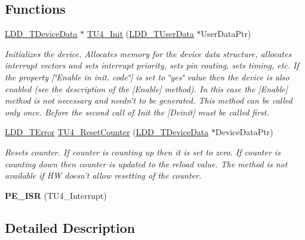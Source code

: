 \subsection*{Functions}
\begin{DoxyCompactItemize}
\item 
\hyperlink{group___p_e___types__module_gac5cf1362f1f0e3a2ce71b1bf2276d091}{L\-D\-D\-\_\-\-T\-Device\-Data} $\ast$ \hyperlink{group___t_u4__module_ga8019b63ee3a85303f1180c62b41d3794}{T\-U4\-\_\-\-Init} (\hyperlink{group___p_e___types__module_ga0b66a73f87238a782318aa0be7578e35}{L\-D\-D\-\_\-\-T\-User\-Data} $\ast$User\-Data\-Ptr)
\begin{DoxyCompactList}\small\item\em Initializes the device. Allocates memory for the device data structure, allocates interrupt vectors and sets interrupt priority, sets pin routing, sets timing, etc. If the property \mbox{[}\char`\"{}\-Enable in init. code\char`\"{}\mbox{]} is set to \char`\"{}yes\char`\"{} value then the device is also enabled (see the description of the \mbox{[}Enable\mbox{]} method). In this case the \mbox{[}Enable\mbox{]} method is not necessary and needn't to be generated. This method can be called only once. Before the second call of Init the \mbox{[}Deinit\mbox{]} must be called first. \end{DoxyCompactList}\item 
\hyperlink{group___p_e___types__module_ga24c2b045fd04e79e85f261ce4df35588}{L\-D\-D\-\_\-\-T\-Error} \hyperlink{group___t_u4__module_gafd7012cc649f611ff7824c1cd7e2dfd0}{T\-U4\-\_\-\-Reset\-Counter} (\hyperlink{group___p_e___types__module_gac5cf1362f1f0e3a2ce71b1bf2276d091}{L\-D\-D\-\_\-\-T\-Device\-Data} $\ast$Device\-Data\-Ptr)
\begin{DoxyCompactList}\small\item\em Resets counter. If counter is counting up then it is set to zero. If counter is counting down then counter is updated to the reload value. The method is not available if H\-W doesn't allow resetting of the counter. \end{DoxyCompactList}\item 
\hypertarget{group___t_u4__module_ga13cf6571293d0689c83802dce45e3505}{{\bfseries P\-E\-\_\-\-I\-S\-R} (T\-U4\-\_\-\-Interrupt)}\label{group___t_u4__module_ga13cf6571293d0689c83802dce45e3505}

\end{DoxyCompactItemize}


\subsection{Detailed Description}


